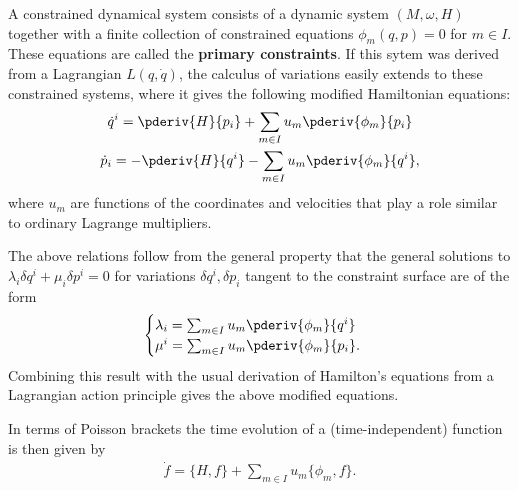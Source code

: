     A constrained dynamical system consists of a dynamic system $(M,\omega,H)$ together with a finite collection of constrained equations $\phi_m(q,p)=0$ for $m\in I$. These equations are called the \textbf{primary constraints}. If this sytem was derived from a Lagrangian $L(q,\dot{q})$, the calculus of variations easily extends to these constrained systems, where it gives the following modified Hamiltonian equations:
    \begin{gather}
        \dot{q}^i = \pderiv{H}{p_i} + \sum_{m\in I}u_m\pderiv{\phi_m}{p_i}\\
        \dot{p}_i = -\pderiv{H}{q^i} - \sum_{m\in I}u_m\pderiv{\phi_m}{q^i},
    \end{gather}
    where $u_m$ are functions of the coordinates and velocities that play a role similar to ordinary Lagrange multipliers.
    \begin{remark}
        The above relations follow from the general property that the general solutions to $\lambda_i\delta q^i + \mu_i\delta p^i = 0$ for variations $\delta q^i,\delta p_i$ tangent to the constraint surface are of the form
        \begin{gather}
            \begin{cases}
                \lambda_i = \sum_{m\in I}u_m\pderiv{\phi_m}{q^i}&\\
                \mu^i = \sum_{m\in I}u_m\pderiv{\phi_m}{p_i}.&
            \end{cases}
        \end{gather}
        Combining this result with the usual derivation of Hamilton's equations from a Lagrangian action principle gives the above modified equations.
    \end{remark}

    In terms of Poisson brackets the time evolution of a (time-independent) function is then given by
    \begin{gather}
        \label{lagrange:modified_poisson_evolution}
        \dot{f} = \{H,f\} + \sum_{m\in I}u_m\{\phi_m,f\}.
    \end{gather}

